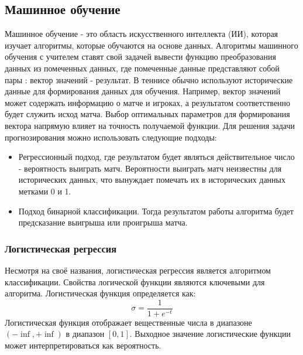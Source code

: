 \subsection{Машинное обучение}
Машинное обучение - это область искусственного интеллекта (ИИ), которая изучает алгоритмы, которые обучаются на основе данных.
Алгоритмы машинного обучения с учителем ставят свой задачей вывести  функцию преобразования данных из помеченных данных, где помеченные данные представляют собой пары : вектор значений  - результат.
В теннисе обычно используют исторические данные для формирования данных для обучения. Например, вектор значений может содержать информацию о матче и игроках, а результатом соответственно  будет служить исход матча. Выбор оптимальных параметров для формирования вектора напрямую влияет на точность получаемой функции.
Для решения задачи прогнозирования можно использовать следующие подходы:
\begin{itemize}
	\item Регрессионный подход, где результатом будет являться действительное число - вероятность выиграть матч. Вероятности выиграть матч неизвестны для исторических данных, что вынуждает помечать их в исторических данных метками 0 и 1.
	\item Подход бинарной классификации. Тогда результатом работы алгоритма будет предсказание выигрыша или проигрыша матча.
\end{itemize}
\break
\subsubsection{Логистическая регрессия}
Несмотря на своё названия, логистическая регрессия является алгоритмом классификации. Свойства логической функции являются ключевыми для алгоритма. Логистическая функция определяется как:
\begin{equation}\label{formula3}
\sigma=\frac{1}{1 + e^{-t}}
\end{equation}
Логистическая функция отображает 
вещественные числа в диапазоне $(-\inf, +\inf)$ в диапазон $[0,1]$. Выходное значение логистические функции может интерпретироваться как вероятность.

